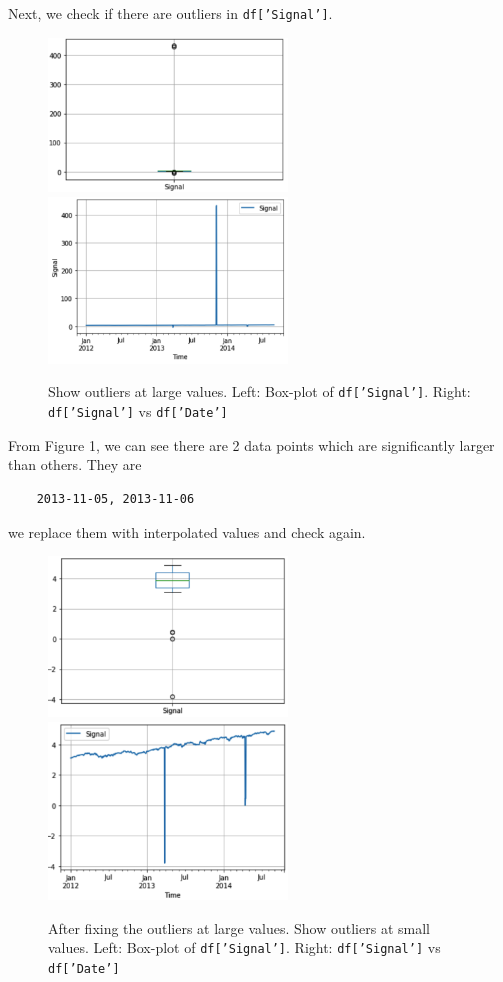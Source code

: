 \documentclass[11pt, oneside]{article}   	%
\begin{document}
Next, we check if there are outliers in \texttt{df['Signal']}.
\begin{figure}[htbp]
   \centering
   \includegraphics[width = 2.5in]{so1.png} 
    \includegraphics[width = 2.5in]{so2.png}
   \caption{Show outliers at large values. Left: Box-plot of \texttt{df['Signal']}.  Right: \texttt{df['Signal']} vs \texttt{df['Date']}}
\end{figure}
From Figure 1, we can see there are 2 data points which are significantly larger than others. They are 
\begin{lstlisting}
	2013-11-05, 2013-11-06
\end{lstlisting}
we  replace them with interpolated values and check again.
\begin{figure}[htbp]
   \centering
   \includegraphics[width = 2.5in]{so3.png} 
    \includegraphics[width = 2.5in]{so4.png}
   \caption{After fixing the outliers at large values.  Show outliers at small values. Left: Box-plot of \texttt{df['Signal']}.  Right: \texttt{df['Signal']} vs \texttt{df['Date']} }
\end{figure}
\end{document}
